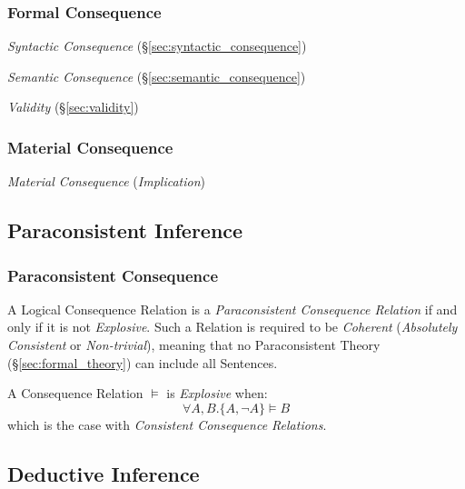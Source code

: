 \subsubsection{Formal Consequence}\label{sec:formal_consequence}

\emph{Syntactic Consequence} (\S\ref{sec:syntactic_consequence})

\emph{Semantic Consequence} (\S\ref{sec:semantic_consequence})

\emph{Validity} (\S\ref{sec:validity})



\subsubsection{Material Consequence}

\emph{Material Consequence} (\emph{Implication})



\subsection{Paraconsistent Inference}\label{sec:paraconsistent_inference}
\cite{priest-tanaka-weber13}

\subsubsection{Paraconsistent Consequence}\label{sec:paraconsistent_consequence}

A Logical Consequence Relation is a \emph{Paraconsistent Consequence
  Relation} if and only if it is not \emph{Explosive}. Such a Relation
is required to be \emph{Coherent} (\emph{Absolutely Consistent} or
\emph{Non-trivial}), meaning that no Paraconsistent Theory
(\S\ref{sec:formal_theory}) can include all Sentences.

A Consequence Relation $\vDash$ is \emph{Explosive} when:
\[
  \forall A, B. \{A, \neg A\} \vDash B
\]
which is the case with \emph{Consistent Consequence Relations}.



\subsection{Deductive Inference}\label{sec:deductive_inference}


